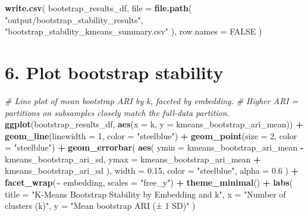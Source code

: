 \documentclass[
  11pt,
]{article}
\newenvironment{Shaded}{\begin{snugshade}}{\end{snugshade}}
\newcommand{\AttributeTok}[1]{\textcolor[rgb]{0.13,0.29,0.53}{#1}}
\newcommand{\CommentTok}[1]{\textcolor[rgb]{0.56,0.35,0.01}{\textit{#1}}}
\newcommand{\ConstantTok}[1]{\textcolor[rgb]{0.56,0.35,0.01}{#1}}
\newcommand{\DecValTok}[1]{\textcolor[rgb]{0.00,0.00,0.81}{#1}}
\newcommand{\FloatTok}[1]{\textcolor[rgb]{0.00,0.00,0.81}{#1}}
\newcommand{\FunctionTok}[1]{\textcolor[rgb]{0.13,0.29,0.53}{\textbf{#1}}}
\newcommand{\NormalTok}[1]{#1}
\newcommand{\SpecialCharTok}[1]{\textcolor[rgb]{0.81,0.36,0.00}{\textbf{#1}}}
\newcommand{\StringTok}[1]{\textcolor[rgb]{0.31,0.60,0.02}{#1}}
\begin{document}
\begin{Shaded}
\begin{Highlighting}[]
\FunctionTok{write.csv}\NormalTok{(}
\NormalTok{  bootstrap\_results\_df,}
  \AttributeTok{file      =} \FunctionTok{file.path}\NormalTok{(}
    \StringTok{"output/bootstrap\_stability\_results"}\NormalTok{,}
    \StringTok{"bootstrap\_stability\_kmeans\_summary.csv"}
\NormalTok{  ),}
  \AttributeTok{row.names =} \ConstantTok{FALSE}
\NormalTok{)}
\end{Highlighting}
\end{Shaded}

\section{6. Plot bootstrap stability}\label{plot-bootstrap-stability}

\begin{Shaded}
\begin{Highlighting}[]
\CommentTok{\# Line plot of mean bootstrap ARI by k, faceted by embedding.}
\CommentTok{\# Higher ARI = partitions on subsamples closely match the full{-}data partition.}
\FunctionTok{ggplot}\NormalTok{(bootstrap\_results\_df, }\FunctionTok{aes}\NormalTok{(}\AttributeTok{x =}\NormalTok{ k, }\AttributeTok{y =}\NormalTok{ kmeans\_bootstrap\_ari\_mean)) }\SpecialCharTok{+}
  \FunctionTok{geom\_line}\NormalTok{(}\AttributeTok{linewidth =} \DecValTok{1}\NormalTok{, }\AttributeTok{color =} \StringTok{"steelblue"}\NormalTok{) }\SpecialCharTok{+}
  \FunctionTok{geom\_point}\NormalTok{(}\AttributeTok{size =} \DecValTok{2}\NormalTok{,    }\AttributeTok{color =} \StringTok{"steelblue"}\NormalTok{) }\SpecialCharTok{+}
  \FunctionTok{geom\_errorbar}\NormalTok{(}
    \FunctionTok{aes}\NormalTok{(}
      \AttributeTok{ymin =}\NormalTok{ kmeans\_bootstrap\_ari\_mean }\SpecialCharTok{{-}}\NormalTok{ kmeans\_bootstrap\_ari\_sd,}
      \AttributeTok{ymax =}\NormalTok{ kmeans\_bootstrap\_ari\_mean }\SpecialCharTok{+}\NormalTok{ kmeans\_bootstrap\_ari\_sd}
\NormalTok{    ),}
    \AttributeTok{width =} \FloatTok{0.15}\NormalTok{, }\AttributeTok{color =} \StringTok{"steelblue"}\NormalTok{, }\AttributeTok{alpha =} \FloatTok{0.6}
\NormalTok{  ) }\SpecialCharTok{+}
  \FunctionTok{facet\_wrap}\NormalTok{(}\SpecialCharTok{\textasciitilde{}}\NormalTok{ embedding, }\AttributeTok{scales =} \StringTok{"free\_y"}\NormalTok{) }\SpecialCharTok{+}
  \FunctionTok{theme\_minimal}\NormalTok{() }\SpecialCharTok{+}
  \FunctionTok{labs}\NormalTok{(}
    \AttributeTok{title =} \StringTok{"K{-}Means Bootstrap Stability by Embedding and k"}\NormalTok{,}
    \AttributeTok{x     =} \StringTok{"Number of clusters (k)"}\NormalTok{,}
    \AttributeTok{y     =} \StringTok{"Mean bootstrap ARI (± 1 SD)"}
\NormalTok{  )}
\end{Highlighting}
\end{Shaded}
\end{document}
